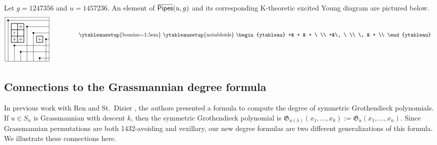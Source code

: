 \documentclass[12pt]{amsart}
\theoremstyle{definition}
\newenvironment{example}
  {\pushQED{\qed}\renewcommand{\qedsymbol}{$\diamondsuit$}\examplex}
  {\popQED\endexamplex}
\theoremstyle{remark}
\numberwithin{equation}{section}
\newcommand{\KPipes}{\overline{\sf Pipes}}
\begin{document}
\begin{example}
Let $g=1247356$ and $u=1457236$.  An element of $\KPipes(u,g)$ and its corresponding K-theoretic excited Young diagram are pictured below.
\[\begin{tikzpicture}[scale=.4]
\draw (0,0) rectangle (7,7);
\draw[line width = .2ex] (1,3) rectangle (3,6);
\draw[line width = .2ex] (6,3) rectangle (5,4);
\draw[line width = .2ex] (2,3) -- (2,6);
\draw[line width = .2ex] (1,4) -- (3,4);
\draw[line width = .2ex] (1,5) -- (3,5);

\filldraw (0.5,6.5) circle (.8ex);
\draw[line width = .1ex] (0.5,0) -- (0.5,6.5) -- (7,6.5);
\filldraw (3.5,5.5) circle (.8ex);
\draw[line width = .1ex] (3.5,0) -- (3.5,5.5) -- (7,5.5);
\filldraw (4.5,4.5) circle (.8ex);
\draw[line width = .1ex] (4.5,0) -- (4.5,4.5) -- (7,4.5);
\filldraw (6.5,3.5) circle (.8ex);
\draw[line width = .1ex] (6.5,0) -- (6.5,3.5) -- (7,3.5);
\filldraw (1.5,2.5) circle (.8ex);
\draw[line width = .1ex] (1.5,0) -- (1.5,2.5) -- (7,2.5);
\filldraw (2.5,1.5) circle (.8ex);
\draw[line width = .1ex] (2.5,0) -- (2.5,1.5) -- (7,1.5);
\filldraw (5.5,0.5) circle (.8ex);
\draw[line width = .1ex] (5.5,0) -- (5.5,0.5) -- (7,0.5);
\node at (1.5,3.5) {$+$};
\node at (2.5,3.5) {$+$};
\node at (5.5,3.5) {$+$};
\node at (1.5,4.5) {$+$};
\node at (2.5,5.5) {$+$};
\end{tikzpicture}
\hspace{5em}
\raisebox{4.5em}{
\ytableausetup
		{boxsize=1.5em}
		\ytableausetup{notabloids}
		\begin{ytableau}
		+& +  & +  \  \\
		 +&\,    \  \\
		\, & +   \\
		\end{ytableau} }
\]
\end{example}
\subsection{Connections to the Grassmannian degree formula}\label{subsec:grConn}
In previous work with Ren and St.~Dizier \cite{RRRSW}, the authors presented a formula to compute the degree of symmetric Grothendieck polynomials.  
If $u\in S_n$ is Grassmannian with descent $k$, then the symmetric Grothendieck polynomial is $\mathfrak G_{u(\lambda)}(x_1,\dots,x_k):=\mathfrak G_u(x_1,\dots,x_n)$.  
Since Grassmannian permutations are both 1432-avoiding and vexillary, our new degree formulas are two different generalizations of this formula.  We illustrate these connections here.
\end{document}
